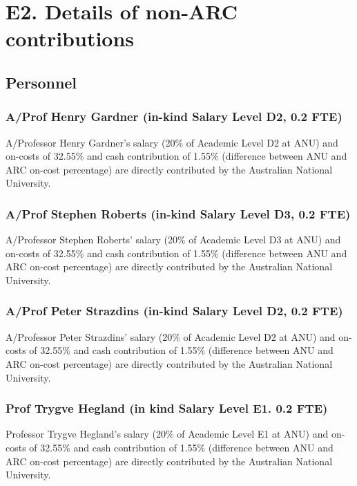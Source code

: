 \documentclass[a4paper,twoside,12pt,compact]{article}
\author{}
\date{\today}
\begin{document}
\section*{E2. Details of non-ARC contributions}
\label{sec:justificatoin}

\subsection*{Personnel}

\subsubsection*{A/Prof Henry Gardner (in-kind Salary Level D2, 0.2 FTE)}
A/Professor  Henry Gardner’s salary (20\% of Academic Level D2 at ANU) 
and on-costs of 32.55\% and cash contribution of 1.55\% 
(difference between ANU and ARC on-cost percentage) are
directly contributed by the Australian National University. 

\subsubsection*{A/Prof Stephen Roberts (in-kind Salary Level D3, 0.2 FTE)}
A/Professor  Stephen Roberts’ salary (20\% of Academic Level D3 at ANU) 
and on-costs of 32.55\% and cash contribution of 1.55\% 
(difference between ANU and ARC on-cost percentage) are
directly contributed by the Australian National University. 

\subsubsection*{A/Prof Peter Strazdins (in-kind Salary Level D2, 0.2 FTE)}
A/Professor  Peter Strazdins’ salary (20\% of Academic Level D2 at ANU) 
and on-costs of 32.55\% and cash contribution of 1.55\% 
(difference between ANU and ARC on-cost percentage) are
directly contributed by the Australian National University. 

\subsubsection*{Prof Trygve Hegland (in kind Salary Level E1. 0.2 FTE)}
Professor  Trygve Hegland's salary (20\% of Academic Level E1 at ANU) 
and on-costs of 32.55\% and cash contribution of 1.55\% 
(difference between ANU and ARC on-cost percentage) are
directly contributed by the Australian National University. 
\end{document}
